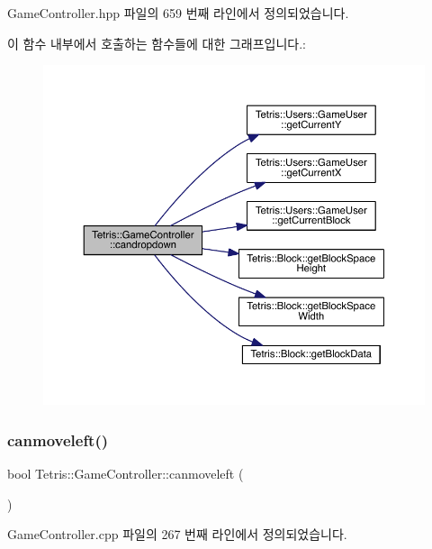 Game\+Controller.\+hpp 파일의 659 번째 라인에서 정의되었습니다.

이 함수 내부에서 호출하는 함수들에 대한 그래프입니다.\+:
\nopagebreak
\begin{figure}[H]
\begin{center}
\leavevmode
\includegraphics[width=350pt]{class_tetris_1_1_game_controller_ac4993d5ad8640ac617fec341fdb301ee_cgraph}
\end{center}
\end{figure}
\mbox{\label{class_tetris_1_1_game_controller_ae541cf926ccdce47a185c94a0c80b642}} 
\subsubsection{\texorpdfstring{canmoveleft()}{canmoveleft()}\hspace{0.1cm}{\footnotesize\ttfamily [1/2]}}
{\footnotesize\ttfamily bool Tetris\+::\+Game\+Controller\+::canmoveleft (\begin{DoxyParamCaption}{ }\end{DoxyParamCaption})}



Game\+Controller.\+cpp 파일의 267 번째 라인에서 정의되었습니다.

